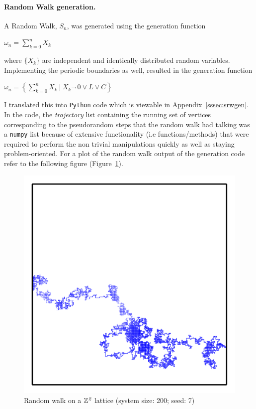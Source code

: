 \documentclass{article}
\newcommand\given[1][]{\:#1\vert\:}
\begin{document}
\paragraph{Random Walk generation.} A Random Walk, $S_{n}$, was generated using the generation function
	\begin{center}
		$\omega_{n} =  \sum_{k=0}^n X_k$
	\end{center}
where $\{X_k\}$ are independent and identically distributed random variables. 
Implementing the periodic boundaries as well, resulted in the generation function 
\begin{center}
		$\omega_{n} =  \left\{ \sum_{k=0}^n X_k \given[\Big] X_k \lnot\ 0 \lor L \lor C \right\}$
\end{center}
I translated this into \texttt{Python} code which is viewable in Appendix~\ref{sssec:srwgen}. In the code, the \emph{trajectory} list containing the running set of vertices corresponding to the pseudorandom steps that the random walk had talking was a \texttt{numpy} list because of extensive functionality (i.e functions/methods) that were required to perform the non trivial manipulations quickly as well as staying problem-oriented. For a plot of the random walk output of the generation code refer to the following figure (Figure~\ref{fig:RW}).
\begin{figure}
	\begin{center}
		\includegraphics[scale=1.6]{RW_200s7hdpi}
		\caption{Random walk on a $\mathbb{Z}^{\emph{2}}$ lattice (system size: 200; seed: 7)}
		\label{fig:RW}
	\end{center}
\end{figure}
\end{document}
